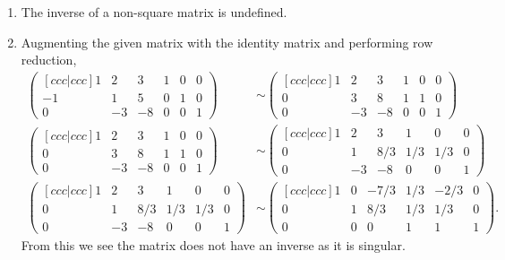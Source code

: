 \documentclass[a4paper]{article}
\begin{document}
\begin{enumerate}
\begin{enumerate}
			\item The inverse of a non-square matrix is undefined.
			
			\item Augmenting the given matrix with the identity matrix and performing row reduction,
			\begin{align*}
				\begin{pmatrix}[ccc|ccc]
					 1 &  2 &  3		& 1 & 0 & 0 \\
					-1 &  1 &  5		& 0 & 1 & 0 \\
					 0 & -3 & -8		& 0 & 0 & 1
				\end{pmatrix}
				& \sim
				\begin{pmatrix}[ccc|ccc]
					 1 &  2 &  3		& 1 & 0 & 0 \\
					 0 &  3 &  8		& 1 & 1 & 0 \\
					 0 & -3 & -8		& 0 & 0 & 1
				\end{pmatrix} \\
				\begin{pmatrix}[ccc|ccc]
					 1 &  2 &  3		& 1 & 0 & 0 \\
					 0 &  3 &  8		& 1 & 1 & 0 \\
					 0 & -3 & -8		& 0 & 0 & 1
				\end{pmatrix}
				& \sim
				\begin{pmatrix}[ccc|ccc]
					 1 &  2 &   3		&   1 &   0 & 0 \\
					 0 &  1 & 8/3		& 1/3 & 1/3 & 0 \\
					 0 & -3 &  -8		&   0 &   0 & 1
				\end{pmatrix} \\
				\begin{pmatrix}[ccc|ccc]
					 1 &  2 &   3		&   1 &   0 & 0 \\
					 0 &  1 & 8/3		& 1/3 & 1/3 & 0 \\
					 0 & -3 &  -8		&   0 &   0 & 1
				\end{pmatrix}
				& \sim
				\begin{pmatrix}[ccc|ccc]
					 1 & 0 & -7/3		& 1/3 & -2/3 & 0 \\
					 0 & 1 &  8/3		& 1/3 &  1/3 & 0 \\
					 0 & 0 &    0		&   1 &    1 & 1
				\end{pmatrix}.
			\end{align*}
			From this we see the matrix does not have an inverse as it is singular.
		\end{enumerate}
		

\end{enumerate}
\end{document}
